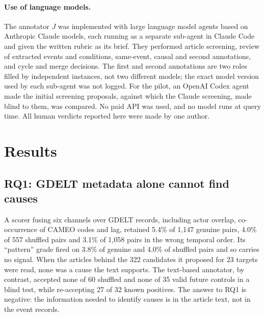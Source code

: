 \documentclass[pdflatex,sn-basic,lineno]{sn-jnl}
\theoremstyle{thmstylethree}
\theoremstyle{thmstyleone}
\begin{document}
\paragraph{Use of language models.} The annotator $J$ was implemented with large language model
agents based on Anthropic Claude models, each running as a separate sub-agent in Claude Code and
given the written rubric as its brief. They performed article screening, review of extracted events
and conditions, same-event, causal and second annotations, and cycle and merge decisions. The
first and second annotations are two roles filled by independent instances, not two different
models; the exact model version used by each sub-agent was not logged. For the pilot, an OpenAI
Codex agent made the initial screening proposals, against which the Claude screening, made blind
to them, was compared. No paid API was used, and no model runs at query time. All human verdicts
reported here were made by one author.

\section{Results}\label{sec:results}

\subsection{RQ1: GDELT metadata alone cannot find causes}
A scorer fusing six channels over GDELT records, including actor overlap, co-occurrence of CAMEO
codes and lag, retained 5.4\% of 1{,}147 genuine pairs, 4.0\% of 557 shuffled pairs and 3.1\% of
1{,}058 pairs in the wrong temporal order. Its ``pattern'' grade fired on 3.8\% of genuine and 4.0\%
of shuffled pairs and so carries no signal. When the articles behind the 322 candidates it proposed
for 23 targets were read, none was a cause the text supports. The text-based annotator, by
contrast, accepted none of 60 shuffled and none of 35 valid future controls in a blind test, while
re-accepting 27 of 32 known positives. The answer to RQ1 is negative: the information needed to
identify causes is in the article text, not in the event records.
\end{document}
